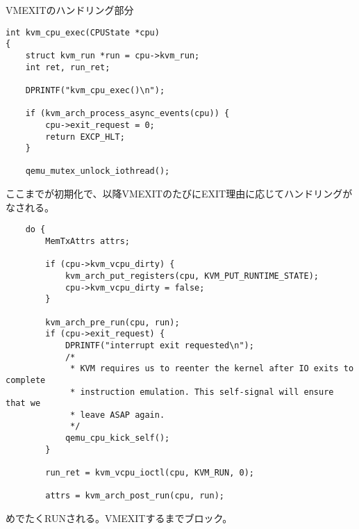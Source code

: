 \documentclass[9pt,b5paper,tombo]{jsbook}
\begin{document}
VMEXITのハンドリング部分

\begin{lstlisting}
int kvm_cpu_exec(CPUState *cpu)
{
    struct kvm_run *run = cpu->kvm_run;
    int ret, run_ret;

    DPRINTF("kvm_cpu_exec()\n");

    if (kvm_arch_process_async_events(cpu)) {
        cpu->exit_request = 0;
        return EXCP_HLT;
    }

    qemu_mutex_unlock_iothread();
\end{lstlisting}

ここまでが初期化で、以降VMEXITのたびにEXIT理由に応じてハンドリングがなされる。

\begin{lstlisting}
    do {
        MemTxAttrs attrs;

        if (cpu->kvm_vcpu_dirty) {
            kvm_arch_put_registers(cpu, KVM_PUT_RUNTIME_STATE);
            cpu->kvm_vcpu_dirty = false;
        }

        kvm_arch_pre_run(cpu, run);
        if (cpu->exit_request) {
            DPRINTF("interrupt exit requested\n");
            /*
             * KVM requires us to reenter the kernel after IO exits to complete
             * instruction emulation. This self-signal will ensure that we
             * leave ASAP again.
             */
            qemu_cpu_kick_self();
        }

        run_ret = kvm_vcpu_ioctl(cpu, KVM_RUN, 0);

        attrs = kvm_arch_post_run(cpu, run);
\end{lstlisting}

めでたくRUNされる。VMEXITするまでブロック。
\end{document}
